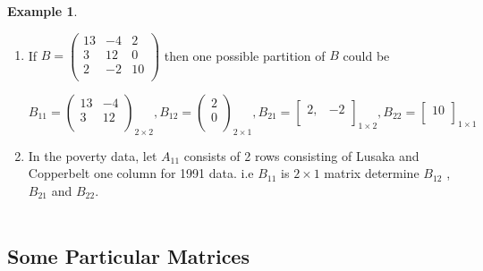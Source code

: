\documentclass[11pt,a4paper]{article}
\theoremstyle{definition}
\newtheorem{exa}[thm]{Example}
\begin{document}
\begin{exa}
\begin{enumerate}
\item If $B = 
\begin{pmatrix}
13 & -4 & 2\\
3 & 12 & 0\\
2 & -2 & 10\\
\end{pmatrix}
$ then one possible partition of $B$ could be

$$B_{11} =
\begin{pmatrix}
13 & -4\\
3 & 12\\
\end{pmatrix}_{2\times 2}, 
B_{12} = 
\begin{pmatrix}
2\\
0\\
\end{pmatrix}_{2\times 1}, 
B_{21} =
\begin{bmatrix}
2, & -2\\
\end{bmatrix}_{1\times 2}, 
B_{22} =
\begin{bmatrix}
10\\
\end{bmatrix}_{1\times 1}
$$

\item In the poverty data, let $A_{11}$ consists of 2 rows consisting of Lusaka and Copperbelt one column for 1991 data. i.e $B_{11}$ is $2\times 1$ matrix determine $B_{12}$ , $B_{21}$ and $B_{22}$.\\\\
\end{enumerate}
\end{exa}




\subsection{Some Particular Matrices}
\end{document}
